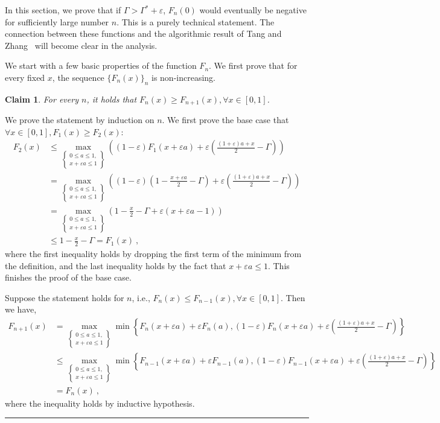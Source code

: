\documentclass[11pt,letterpaper]{article}
\newenvironment{proof}{{\bf Proof:  }}{\hfill\rule{2mm}{2mm}\vspace*{5pt}}
\newtheorem{claim}{Claim}[section]
\newcommand{\eps}{\varepsilon}
\begin{document}
In this section, we prove that if $\Gamma > \Gamma^*+\eps$, $F_n(0)$ would eventually be negative for sufficiently large number $n$. This is a purely technical statement. The connection between these functions and the algorithmic result of Tang and Zhang~\cite{ec/TangZ24} will become clear in the analysis. 

We start with a few basic properties of the function $F_n$. We first prove that for every fixed $x$, the sequence $\{F_n(x)\}_n$ is non-increasing.
\begin{claim}
\label{cl:monotone}
For every $n$, it holds that $F_n(x) \ge F_{n+1}(x), \forall x \in [0,1]$.
\end{claim}
\begin{proof}
We prove the statement by induction on $n$. We first prove the base case that $\forall x \in [0,1], F_1(x) \ge F_2(x)$:
\begin{align*}
F_2(x) & \le \max_{ \left\{ \substack{0\le a\le 1, \\ x+\eps a\le 1} \right\}} \left( (1-\eps) F_1(x+\eps a)+ \eps \left(\frac{(1+\eps)a + x}{2} - \Gamma \right) \right) \\
& = \max_{ \left\{ \substack{0\le a\le 1, \\ x+\eps a\le 1} \right\}}\left( (1-\eps) \left( 1- \frac{x+\eps a}{2} - \Gamma \right) + \eps \left(\frac{(1+\eps)a + x}{2} - \Gamma \right) \right) \\
& = \max_{ \left\{ \substack{0\le a\le 1, \\ x+\eps a\le 1} \right\}} \left( 1 - \frac{x}{2} - \Gamma + \eps ( x+\eps a-1) \right) \\
& \le 1-\frac{x}{2} - \Gamma = F_1(x)~,
\end{align*}
where the first inequality holds by dropping the first term of the minimum from the definition, and the last inequality holds by the fact that $x+\eps a \le 1$. This finishes the proof of the base case.

Suppose the statement holds for $n$, i.e., $F_n(x) \le F_{n-1}(x), \forall x \in [0,1]$. Then we have,
\begin{align*}
F_{n+1}(x) & = \max_{ \left\{ \substack{0\le a\le 1, \\ x+\eps a\le 1} \right\}} \min \left\{ F_n(x+\eps a) + \eps F_n(a), (1-\eps) F_n(x+\eps a)+ \eps \left(\frac{(1+\eps)a + x}{2} - \Gamma \right) \right\} \\
& \le \max_{ \left\{ \substack{0\le a\le 1, \\ x+\eps a\le 1} \right\}} \min \left\{ F_{n-1}(x+\eps a) + \eps F_{n-1}(a), (1-\eps) F_{n-1}(x+\eps a)+ \eps \left(\frac{(1+\eps)a + x}{2} - \Gamma \right) \right\} \\
& = F_n(x)~,
\end{align*}
where the inequality holds by inductive hypothesis.
\end{proof}
\end{document}
